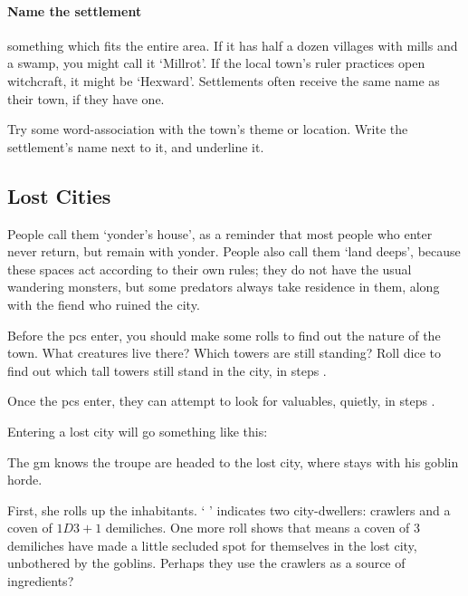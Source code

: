 \begin{multicols}{2}
\paragraph{Name the settlement}
something which fits the entire area.
If it has half a dozen \glspl{village} with mills and a swamp, you might call it `Millrot'.
If the local town's ruler practices open \gls{witchcraft}, it might be `Hexward'.
Settlements often receive the same name as their town, if they have one.

Try some word-association with the town's theme or location.
Write the settlement's name next to it, and underline it.

\subsection{Lost Cities}
\label{lostCities}


People call them `\gls{yonder}'s house', as a reminder that most people who enter never return, but remain with \gls{yonder}.
People also call them `land \glspl{deep}', because these spaces act according to their own rules; they do not have the usual wandering monsters, but some predators always take residence in them, along with the fiend who ruined the city.

Before the \glspl{pc} enter, you should make some rolls to find out the nature of the town.
What creatures live there?
Which towers are still standing?
Roll dice to find out which tall towers still stand in the city, in steps .

Once the \glspl{pc} enter, they can attempt to look for valuables, quietly, in steps .

Entering a lost city will go something like this:

\begin{exampletext}
  The \gls{gm} knows the troupe are headed to the lost city, where  stays with his goblin horde.

  First, she rolls up the inhabitants.
  `  ' indicates two city-dwellers: \glspl{crawler} and a coven of $1D3+1$ demiliches.
  One more roll shows that means a coven of 3 demiliches have made a little secluded spot for themselves in the lost city, unbothered by the goblins.
  Perhaps they use the \glspl{crawler} as a source of \glspl{ingredient}?


\end{exampletext}
\end{multicols}
